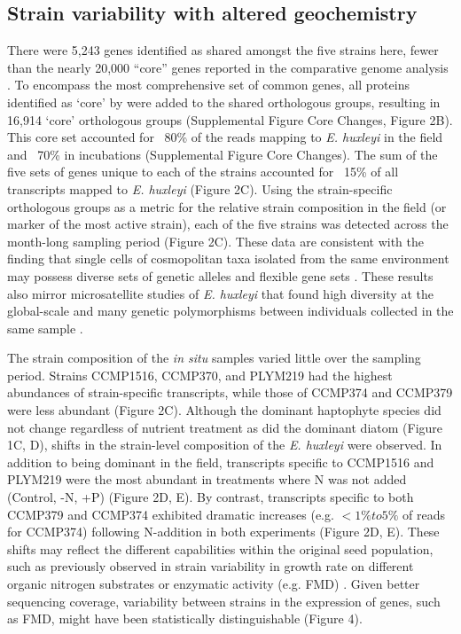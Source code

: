 \subsection{Strain variability with altered geochemistry}

There were 5,243 genes identified as shared amongst the five strains here, fewer than the nearly 20,000 ``core'' genes reported in the comparative genome analysis \citep{Read2013}. To encompass the most comprehensive set of common genes, all proteins identified as `core' by \citet{Read2013} were added to the shared orthologous groups, resulting in 16,914 `core' orthologous groups (Supplemental Figure Core Changes, Figure 2B). This core set accounted for ~80\% of the reads mapping to \textit{E. huxleyi} in the field and ~70\% in incubations (Supplemental Figure Core Changes). The sum of the five sets of genes unique to each of the strains accounted for ~15\% of all transcripts mapped to \textit{E. huxleyi} (Figure 2C). Using the strain-specific orthologous groups as a metric for the relative strain composition in the field (or marker of the most active strain), each of the five strains was detected across the month-long sampling period (Figure 2C).  These data are consistent with the finding that single cells of cosmopolitan taxa isolated from the same environment may possess diverse sets of genetic alleles and flexible gene sets \citep{Kashtan2014}. These results also mirror microsatellite studies of \textit{E. huxleyi} that found high diversity at the global-scale and many genetic polymorphisms between individuals collected in the same sample \citep{Iglesias-Rodriguez2006}. \par

The strain composition of the \textit{in situ} samples varied little over the sampling period. Strains CCMP1516, CCMP370, and PLYM219 had the highest abundances of strain-specific transcripts, while those of CCMP374 and CCMP379 were less abundant (Figure 2C). Although the dominant haptophyte species did not change regardless of nutrient treatment as did the dominant diatom (Figure 1C, D), shifts in the strain-level composition of the \textit{E. huxleyi} were observed. In addition to being dominant in the field, transcripts specific to CCMP1516 and PLYM219 were the most abundant in treatments where N was not added (Control, -N, +P) (Figure 2D, E). By contrast, transcripts specific to both CCMP379 and CCMP374 exhibited dramatic increases (e.g. $<1\% to 5\%$ of reads for CCMP374) following N-addition in both experiments (Figure 2D, E). These shifts may reflect the different capabilities within the original seed population, such as previously observed in strain variability in growth rate on different organic nitrogen substrates \citep{Strom2009} or enzymatic activity (e.g. FMD) \citep{Palenik1997, Bruhn2010}. Given better sequencing coverage, variability between strains in the expression of genes, such as FMD, might have been statistically distinguishable (Figure 4).\par

